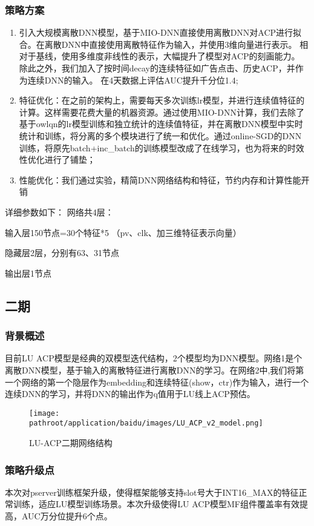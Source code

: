 \documentclass[10pt,a4paper]{ctexbook}
\providecommand{\pathroot}{../..}
\begin{document}
\subsubsection{策略方案}
\begin{enumerate}
\item 引入大规模离散DNN模型，基于MIO-DNN直接使用离散DNN对ACP进行拟合。在离散DNN中直接使用离散特征作为输入，并使用3维向量进行表示。
相对于基线，使用多维度非线性的表示，大幅提升了模型对ACP的刻画能力。
除此之外，我们加入了按时间decay的连续特征如广告点击、历史ACP，并作为连续DNN的输入。
在4天数据上评估AUC提升千分位1.4;
\item 特征优化：在之前的架构上，需要每天多次训练lr模型，并进行连续值特征的计算。这样需要花费大量的机器资源。通过使用MIO-DNN计算，我们去除了基于owlqn的lr模型训练和独立统计的连续值特征，并在离散DNN模型中实时统计和训练，将分离的多个模块进行了统一和优化。通过online-SGD的DNN训练，将原先batch+inc\_batch的训练模型改成了在线学习，也为将来的时效性优化进行了铺垫；
\item 性能优化：我们通过实验，精简DNN网络结构和特征，节约内存和计算性能开销
\end{enumerate}
 
详细参数如下：
网络共4层：

输入层150节点=30个特征*5 （pv、clk、加三维特征表示向量）

隐藏层2层，分别有63、31节点

输出层1节点

\subsection{二期}
\subsubsection{背景概述}
目前LU ACP模型是经典的双模型迭代结构，2个模型均为DNN模型。网络1是个离散DNN模型，基于输入的离散特征进行离散DNN的学习。在网络2中,我们将第一个网络的第一个隐层作为embedding和连续特征(show，ctr)作为输入，进行一个连续DNN的学习，并将DNN的输出作为q值用于LU线上ACP预估。

\begin{figure}[ht]
    \centering
    \texttt{[image: \\pathroot/application/baidu/images/LU\_ACP\_v2\_model.png]}
    \caption{LU-ACP二期网络结构}
    \label{fig:lu_acp_v2_model}
\end{figure}

\subsubsection{策略升级点}
本次对pserver训练框架升级，使得框架能够支持slot号大于INT16\_MAX的特征正常训练，适应LU模型训练场景。本次升级使得LU ACP模型MF组件覆盖率有效提高，AUC万分位提升6个点。

\ifx\mlbook\undefined
    
\end{document}
